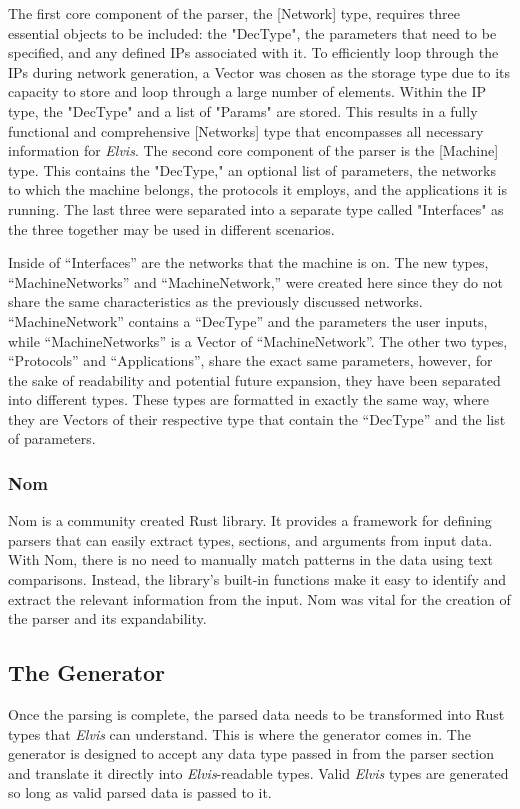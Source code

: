 \documentclass[journal]{IEEEtran} %
\newcommand{\elvis}{\textit{Elvis}}
\begin{document}
The first core component of the parser, the [Network] type, requires three essential objects to be included: the "DecType", the parameters that need to be specified, and any defined IPs associated with it. To efficiently loop through the IPs during network generation, a Vector was chosen as the storage type due to its capacity to store and loop through a large number of elements. Within the IP type, the "DecType" and a list of "Params" are stored. This results in a fully functional and comprehensive [Networks] type that encompasses all necessary information for \elvis{}.
The second core component of the parser is the [Machine] type. This contains the "DecType," an optional list of parameters, the networks to which the machine belongs, the protocols it employs, and the applications it is running. The last three were separated into a separate type called "Interfaces" as the three together may be used in different scenarios.

Inside of “Interfaces” are the networks that the machine is on. The new types, “MachineNetworks” and “MachineNetwork,” were created here since they do not share the same characteristics as the previously discussed networks. “MachineNetwork” contains a “DecType” and the parameters the user inputs, while “MachineNetworks” is a Vector of “MachineNetwork”. The other two types, “Protocols” and “Applications”, share the exact same parameters, however, for the sake of readability and potential future expansion, they have been separated into different types. These types are formatted in exactly the same way, where they are Vectors of their respective type that contain the “DecType” and the list of parameters.

\subsubsection{Nom}
Nom is a community created Rust library. It provides a framework for defining parsers that can easily extract types, sections, and arguments from input data. With Nom, there is no need to manually match patterns in the data using text comparisons. Instead, the library's built-in functions make it easy to identify and extract the relevant information from the input. Nom was vital for the creation of the parser and its expandability.

\subsection{The Generator}
Once the parsing is complete, the parsed data needs to be transformed into Rust types that \elvis{} can understand. This is where the generator comes in. The generator is designed to accept any data type passed in from the parser section and translate it directly into \elvis-readable types. Valid \elvis{} types are generated so long as valid parsed data is passed to it.
\end{document}
